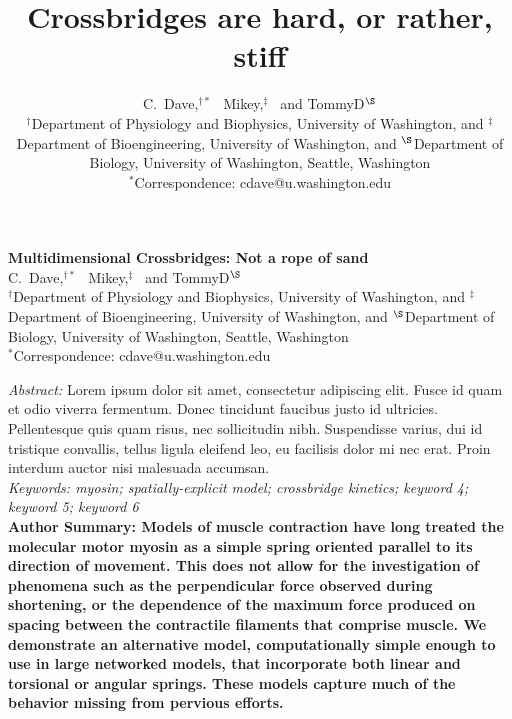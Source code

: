 \documentclass[11pt]{article}
\title{Crossbridges are hard, or rather, stiff}
\author{
	C.~Dave,$^{\dagger \ast}$~
	Mikey,$^\ddagger$~
	and TommyD$^\S$\\ 
	\small 
	$^\dagger$Department of Physiology and Biophysics, University of Washington, and 
	$^\ddagger$Department of Bioengineering, University of Washington, and 
	$^\S$Department of Biology, University of Washington, Seattle, Washington \\
	$^\ast$Correspondence: cdave@u.washington.edu
	\normalsize
}
\date{}
\begin{document}
{\selectfont

\LARGE
\noindent \textbf{Multidimensional Crossbridges: Not a rope of sand }\\

	\large
	\noindent C.~Dave,$^{\dagger \ast}$~
	Mikey,$^\ddagger$~
	and TommyD$^\S$\\ 
	\small 
	$^\dagger$Department of Physiology and Biophysics, University of Washington, and 
	$^\ddagger$Department of Bioengineering, University of Washington, and 
	$^\S$Department of Biology, University of Washington, Seattle, Washington \\
	$^\ast$Correspondence: cdave@u.washington.edu \\
	\normalsize


\noindent \emph{Abstract:} 
Lorem ipsum dolor sit amet, consectetur adipiscing elit. Fusce id quam et odio viverra fermentum. Donec tincidunt faucibus justo id ultricies. Pellentesque quis quam risus, nec sollicitudin nibh. Suspendisse varius, dui id tristique convallis, tellus ligula eleifend leo, eu facilisis dolor mi nec erat. Proin interdum auctor nisi malesuada accumsan.  \\[.5em]
{\footnotesize \emph{
Keywords: myosin; spatially-explicit model; crossbridge kinetics; keyword 4; keyword 5; keyword 6}} \\[.5em]
 {\footnotesize \textbf{
 Author Summary: Models of muscle contraction have long treated the molecular motor myosin as a simple spring oriented parallel to its direction of movement. This does not allow for the investigation of phenomena such as the perpendicular force observed during shortening, or the dependence of the maximum force produced on spacing between the contractile filaments that comprise muscle. We demonstrate an alternative model, computationally simple enough to use in large networked models, that incorporate both linear and torsional or angular springs. These models capture much of the behavior missing from pervious efforts.}}} \\
\end{document}
